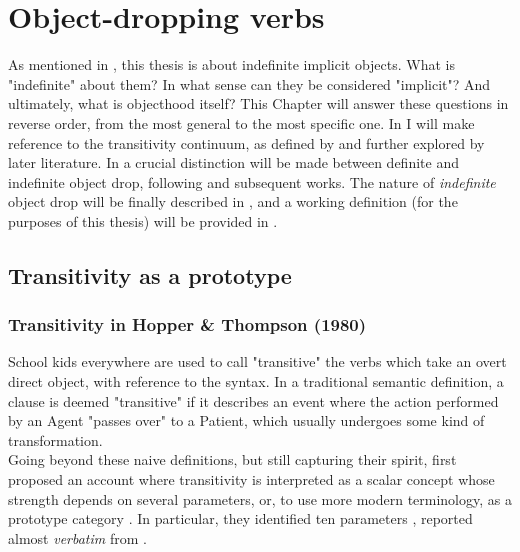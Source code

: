 \setchapterpreamble[u]{\margintoc}
\chapter{Object-dropping verbs}

As mentioned in , this thesis is about indefinite implicit objects. What is "indefinite" about them? In what sense can they be considered "implicit"? And ultimately, what is objecthood itself? This Chapter will answer these questions in reverse order, from the most general to the most specific one. In  I will make reference to the transitivity continuum, as defined by \textcite{HopperThompson1980} and further explored by later literature. In  a crucial distinction will be made between definite and indefinite object drop, following \textcite{Fillmore1986} and subsequent works. The nature of \textit{indefinite} object drop will be finally described in , and a working definition (for the purposes of this thesis) will be provided in .

\section{Transitivity as a prototype} 

\subsection{Transitivity in Hopper \& Thompson (1980)} 
School kids everywhere are used to call "transitive" the verbs which take an overt direct object, with reference to the syntax. In a traditional semantic definition, a clause is deemed "transitive" if it describes an event where the action performed by an Agent "passes over" to a Patient, which usually undergoes some kind of transformation.\\
Going beyond these naive definitions, but still capturing their spirit, \textcite{HopperThompson1980} first proposed an account where transitivity is interpreted as a scalar concept whose strength depends on several parameters, or, to use more modern terminology, as a prototype category \parencite{Naess2007}. In particular, they identified ten parameters \parencite[252]{HopperThompson1980}, reported almost \textit{verbatim} from .

